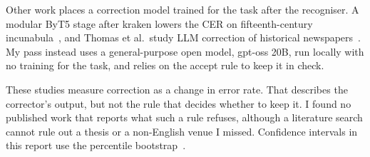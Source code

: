 Other work places a correction model trained for the task after the
recogniser. A modular ByT5 stage after kraken lowers the CER on
fifteenth-century incunabula~\cite{momtaz2025modular}, and Thomas et al.\ study
LLM correction of historical newspapers~\cite{thomas2024leveraging}. My pass
instead uses a general-purpose open model, gpt-oss 20B, run locally with no
training for the task, and relies on the accept rule to keep it in check.

These studies measure correction as a change in error rate. That describes the
corrector's output, but not the rule that decides whether to keep it. I found
no published work that reports what such a rule refuses, although a literature
search cannot rule out a thesis or a non-English venue I missed. Confidence
intervals in this report use the percentile bootstrap~\cite{efron1994bootstrap}.
